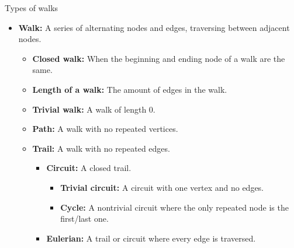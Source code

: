     \newpage

        \begin{intro}{Types of walks}
            \begin{itemize}
                \item   \textbf{Walk:}   A series of alternating
                        nodes and edges, traversing between adjacent nodes.
                    \begin{itemize}
                        \item   \textbf{Closed walk:} When the beginning
                            and ending node of a walk are the same.
                        \item  \textbf{Length of a walk:} The amount
                            of edges in the walk.
                        \item   \textbf{Trivial walk:} A walk of length 0.
                        \item   \textbf{Path:} A walk with no repeated vertices.
                        \item   \textbf{Trail:} A walk with no repeated edges.
                            \begin{itemize}
                                \item   \textbf{Circuit:} A closed trail.
                                \begin{itemize}
                                    \item   \textbf{Trivial circuit:} A circuit with one vertex and no edges.
                                    \item   \textbf{Cycle:} A nontrivial circuit where the only repeated node is the first/last one.
                                \end{itemize}
                                \item   \textbf{Eulerian:} A trail or circuit where every edge is traversed.
                            \end{itemize}
                    \end{itemize}

            \end{itemize}
        \end{intro}

